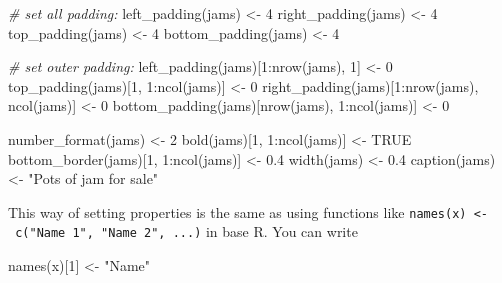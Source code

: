 \documentclass[
]{article}
\newenvironment{Shaded}{\begin{snugshade}}{\end{snugshade}}
\newcommand{\CommentTok}[1]{\textcolor[rgb]{0.56,0.35,0.01}{\textit{#1}}}
\newcommand{\ConstantTok}[1]{\textcolor[rgb]{0.00,0.00,0.00}{#1}}
\newcommand{\DecValTok}[1]{\textcolor[rgb]{0.00,0.00,0.81}{#1}}
\newcommand{\FloatTok}[1]{\textcolor[rgb]{0.00,0.00,0.81}{#1}}
\newcommand{\FunctionTok}[1]{\textcolor[rgb]{0.00,0.00,0.00}{#1}}
\newcommand{\NormalTok}[1]{#1}
\newcommand{\OtherTok}[1]{\textcolor[rgb]{0.56,0.35,0.01}{#1}}
\newcommand{\SpecialCharTok}[1]{\textcolor[rgb]{0.00,0.00,0.00}{#1}}
\newcommand{\StringTok}[1]{\textcolor[rgb]{0.31,0.60,0.02}{#1}}
\begin{document}
\begin{Shaded}
\begin{Highlighting}[]
\CommentTok{\# set all padding:}
\FunctionTok{left\_padding}\NormalTok{(jams) }\OtherTok{\textless{}{-}} \DecValTok{4}
\FunctionTok{right\_padding}\NormalTok{(jams) }\OtherTok{\textless{}{-}} \DecValTok{4}
\FunctionTok{top\_padding}\NormalTok{(jams) }\OtherTok{\textless{}{-}} \DecValTok{4}
\FunctionTok{bottom\_padding}\NormalTok{(jams) }\OtherTok{\textless{}{-}} \DecValTok{4}

\CommentTok{\# set outer padding:}
\FunctionTok{left\_padding}\NormalTok{(jams)[}\DecValTok{1}\SpecialCharTok{:}\FunctionTok{nrow}\NormalTok{(jams), }\DecValTok{1}\NormalTok{] }\OtherTok{\textless{}{-}} \DecValTok{0}
\FunctionTok{top\_padding}\NormalTok{(jams)[}\DecValTok{1}\NormalTok{, }\DecValTok{1}\SpecialCharTok{:}\FunctionTok{ncol}\NormalTok{(jams)] }\OtherTok{\textless{}{-}} \DecValTok{0}
\FunctionTok{right\_padding}\NormalTok{(jams)[}\DecValTok{1}\SpecialCharTok{:}\FunctionTok{nrow}\NormalTok{(jams), }\FunctionTok{ncol}\NormalTok{(jams)] }\OtherTok{\textless{}{-}} \DecValTok{0}
\FunctionTok{bottom\_padding}\NormalTok{(jams)[}\FunctionTok{nrow}\NormalTok{(jams), }\DecValTok{1}\SpecialCharTok{:}\FunctionTok{ncol}\NormalTok{(jams)] }\OtherTok{\textless{}{-}} \DecValTok{0}

\FunctionTok{number\_format}\NormalTok{(jams) }\OtherTok{\textless{}{-}} \DecValTok{2}
\FunctionTok{bold}\NormalTok{(jams)[}\DecValTok{1}\NormalTok{, }\DecValTok{1}\SpecialCharTok{:}\FunctionTok{ncol}\NormalTok{(jams)] }\OtherTok{\textless{}{-}} \ConstantTok{TRUE}
\FunctionTok{bottom\_border}\NormalTok{(jams)[}\DecValTok{1}\NormalTok{, }\DecValTok{1}\SpecialCharTok{:}\FunctionTok{ncol}\NormalTok{(jams)] }\OtherTok{\textless{}{-}} \FloatTok{0.4}
\FunctionTok{width}\NormalTok{(jams) }\OtherTok{\textless{}{-}} \FloatTok{0.4}
\FunctionTok{caption}\NormalTok{(jams) }\OtherTok{\textless{}{-}} \StringTok{"Pots of jam for sale"}
\end{Highlighting}
\end{Shaded}

\FloatBarrier

This way of setting properties is the same as using functions like
\texttt{names(x)\ \textless{}-\ c("Name\ 1",\ "Name\ 2",\ ...)} in base
R. You can write

\begin{Shaded}
\begin{Highlighting}[]
\FunctionTok{names}\NormalTok{(x)[}\DecValTok{1}\NormalTok{] }\OtherTok{\textless{}{-}} \StringTok{"Name"}
\end{Highlighting}
\end{Shaded}
\end{document}
